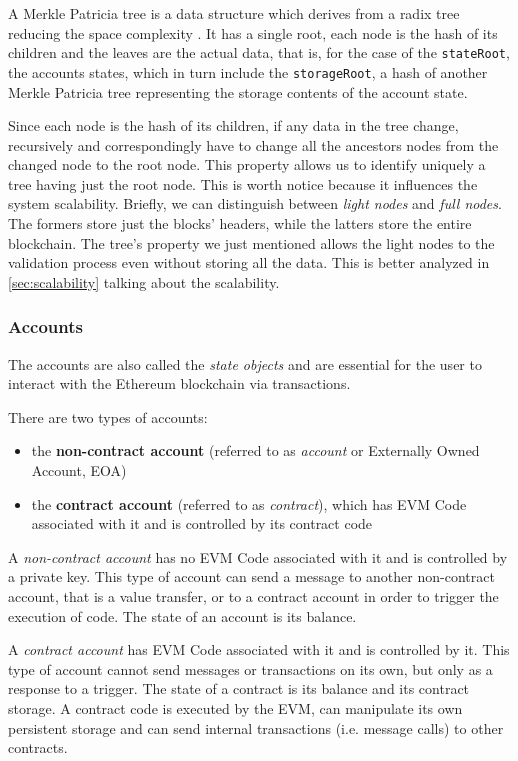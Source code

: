 A Merkle Patricia tree is a data structure which derives from a radix tree
reducing the space complexity \cite{patriciatree}. It has a single root, each
node is the hash of its children and the leaves are the actual data, that is,
for the case of the \verb+stateRoot+, the accounts states, which in turn include
the \verb+storageRoot+, a hash of another Merkle Patricia tree representing the
storage contents of the account state.

Since each node is the hash of its children, if any data in the tree change,
recursively and correspondingly have to change all the ancestors nodes from the
changed node to the root node. This property allows us to identify uniquely a
tree having just the root node. This is worth notice because it influences
the system scalability. Briefly, we can distinguish between \emph{light nodes}
and \emph{full nodes}. The formers store just the blocks' headers, while the
latters store the entire blockchain. The tree's property we just mentioned
allows the light nodes to the validation process even without storing all the
data. This is better analyzed in \autoref{sec:scalability} talking about the
scalability.

\subsubsection{Accounts}
\label{sec:accounts}

The accounts are also called the \emph{state objects} and are essential for the
user to interact with the Ethereum blockchain via transactions.

There are two types of accounts:

\begin{itemize}
  \item the \textbf{non-contract account} (referred to as \emph{account} or
  Externally Owned Account, EOA)
  \item the \textbf{contract account} (referred to as \emph{contract}), which
  has EVM Code associated with it and is controlled by its contract code
\end{itemize}

A \emph{non-contract account} has no EVM Code associated with it and is
controlled by a private key. This type of account can send a message to another
non-contract account, that is a value transfer, or to a contract account in
order to trigger the execution of code. The state of an account is its balance.

A \emph{contract account} has EVM Code associated with it and is controlled by
it. This type of account cannot send messages or transactions on its own, but
only as a response to a trigger. The state of a contract is its balance and its
contract storage. A contract code is executed by the EVM, can manipulate its own
persistent storage and can send internal transactions (i.e. message calls) to
other contracts.
